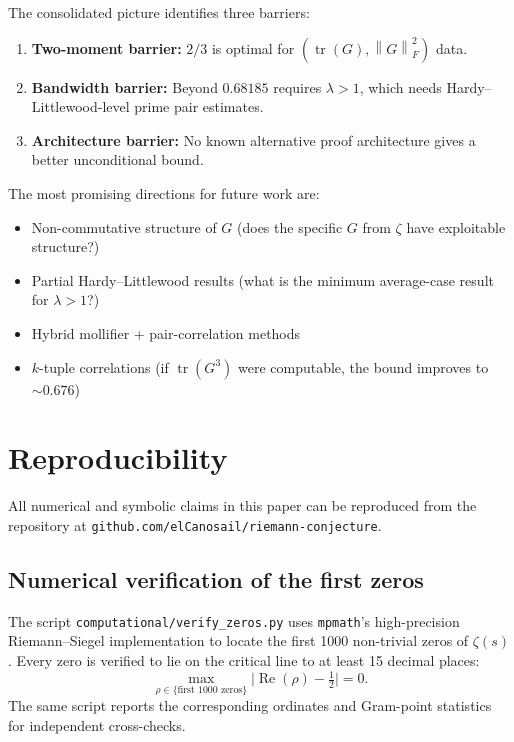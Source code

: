 \documentclass[11pt,a4paper]{article}
\theoremstyle{definition}
\theoremstyle{remark}
\newcommand{\tr}{\operatorname{tr}}
\newcommand{\norm}[1]{\left\|{#1}\right\|}
\begin{document}
The consolidated picture identifies three barriers:
\begin{enumerate}
    \item \textbf{Two-moment barrier:} $2/3$ is optimal for $(\tr(G), \norm{G}_F^2)$ data.
    \item \textbf{Bandwidth barrier:} Beyond $0.68185$ requires $\lambda > 1$, which needs Hardy--Littlewood-level prime pair estimates.
    \item \textbf{Architecture barrier:} No known alternative proof architecture gives a better unconditional bound.
\end{enumerate}

The most promising directions for future work are:
\begin{itemize}
    \item Non-commutative structure of $G$ (does the specific $G$ from $\zeta$ have exploitable structure?)
    \item Partial Hardy--Littlewood results (what is the minimum average-case result for $\lambda > 1$?)
    \item Hybrid mollifier + pair-correlation methods
    \item $k$-tuple correlations (if $\tr(G^3)$ were computable, the bound improves to $\sim 0.676$)
\end{itemize}

\section{Reproducibility}
\label{sec:reproducibility}

All numerical and symbolic claims in this paper can be reproduced from the repository at \texttt{github.com/elCanosail/riemann-conjecture}.

\subsection{Numerical verification of the first zeros}

The script \texttt{computational/verify\_zeros.py} uses \texttt{mpmath}'s high-precision Riemann--Siegel implementation to locate the first 1000 non-trivial zeros of $\zeta(s)$. Every zero is verified to lie on the critical line to at least 15 decimal places:
\[
\max_{\rho \in \{\text{first 1000 zeros}\}} \bigl|\operatorname{Re}(\rho) - \tfrac12\bigr| = 0.
\]
The same script reports the corresponding ordinates and Gram-point statistics for independent cross-checks.
\end{document}
